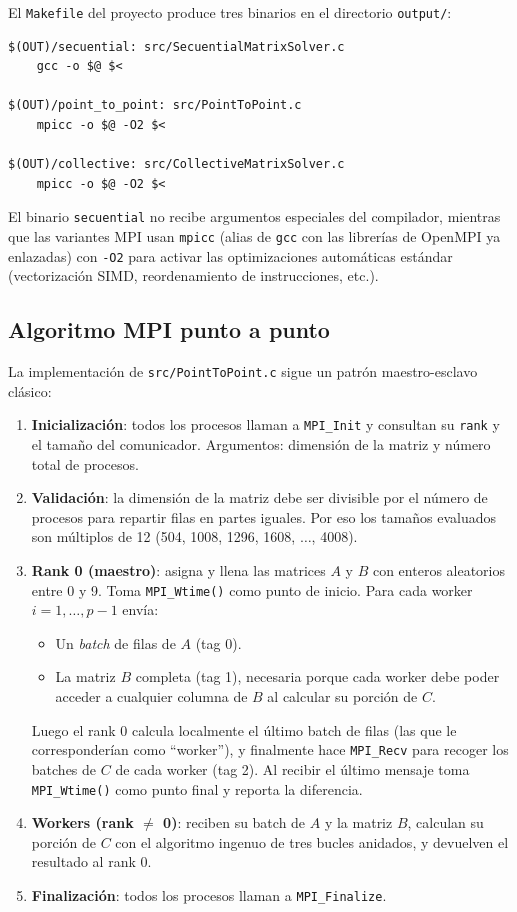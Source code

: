 \documentclass{article}
\begin{document}
El \texttt{Makefile} del proyecto produce tres binarios en el directorio \texttt{output/}:

\begin{verbatim}
$(OUT)/secuential: src/SecuentialMatrixSolver.c
    gcc -o $@ $<

$(OUT)/point_to_point: src/PointToPoint.c
    mpicc -o $@ -O2 $<

$(OUT)/collective: src/CollectiveMatrixSolver.c
    mpicc -o $@ -O2 $<
\end{verbatim}

El binario \texttt{secuential} no recibe argumentos especiales del compilador, mientras que las variantes MPI usan \texttt{mpicc} (alias de \texttt{gcc} con las librerías de OpenMPI ya enlazadas) con \texttt{-O2} para activar las optimizaciones automáticas estándar (vectorización SIMD, reordenamiento de instrucciones, etc.).

\subsection{Algoritmo MPI punto a punto}
\label{sec:algoritmo}

La implementación de \texttt{src/PointToPoint.c} sigue un patrón maestro-esclavo clásico:

\begin{enumerate}
    \item \textbf{Inicialización}: todos los procesos llaman a \texttt{MPI\_Init} y consultan su \texttt{rank} y el tamaño del comunicador. Argumentos: dimensión de la matriz y número total de procesos.
    \item \textbf{Validación}: la dimensión de la matriz debe ser divisible por el número de procesos para repartir filas en partes iguales. Por eso los tamaños evaluados son múltiplos de 12 (504, 1008, 1296, 1608, $\ldots$, 4008).
    \item \textbf{Rank 0 (maestro)}: asigna y llena las matrices $A$ y $B$ con enteros aleatorios entre 0 y 9. Toma \texttt{MPI\_Wtime()} como punto de inicio. Para cada worker $i = 1, \ldots, p-1$ envía:
    \begin{itemize}
        \item Un \emph{batch} de filas de $A$ (tag 0).
        \item La matriz $B$ completa (tag 1), necesaria porque cada worker debe poder acceder a cualquier columna de $B$ al calcular su porción de $C$.
    \end{itemize}
    Luego el rank 0 calcula localmente el último batch de filas (las que le corresponderían como ``worker''), y finalmente hace \texttt{MPI\_Recv} para recoger los batches de $C$ de cada worker (tag 2). Al recibir el último mensaje toma \texttt{MPI\_Wtime()} como punto final y reporta la diferencia.
    \item \textbf{Workers (rank $\neq$ 0)}: reciben su batch de $A$ y la matriz $B$, calculan su porción de $C$ con el algoritmo ingenuo de tres bucles anidados, y devuelven el resultado al rank 0.
    \item \textbf{Finalización}: todos los procesos llaman a \texttt{MPI\_Finalize}.
\end{enumerate}
\end{document}
